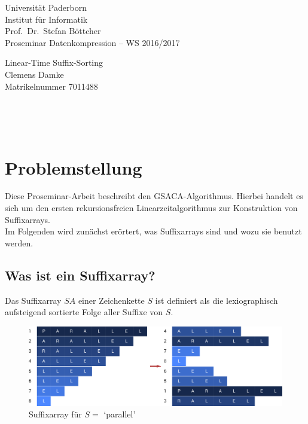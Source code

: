 \documentclass[twoside,11pt]{article}
\theoremstyle{break}
\begin{document}
\pagestyle{empty}

\begin{center}
	\sffamily
    Universität Paderborn \\
    Institut für Informatik \\
    Prof.\ Dr.\ Stefan Böttcher\\[2ex]
    \Large Proseminar Datenkompression – WS 2016/2017

	\vspace*{\fill}
	\Huge \textcolor{blau}{Linear-Time Suffix-Sorting} \\[1ex]
    \LARGE Clemens Damke \\[1ex]
    \Large Matrikelnummer 7011488
	\vspace*{\fill}
\end{center}

\newpage
\
\newpage

\pagestyle{fancy}
\tableofcontents

\newpage
\pagestyle{empty}
\
\newpage
\pagestyle{fancy}

\section{Problemstellung}

Diese Proseminar-Arbeit beschreibt den GSACA-Algorithmus. Hierbei handelt es sich um den ersten rekursionsfreien Linearzeitalgorithmus zur Konstruktion von Suffixarrays. \\

Im Folgenden wird zunächst erörtert, was Suffixarrays sind und wozu sie benutzt werden.

\subsection{Was ist ein Suffixarray?}

Das Suffixarray $SA$ einer Zeichenkette $S$ ist definiert als die lexiographisch aufsteigend sortierte Folge aller Suffixe von $S$.

\begin{figure}[h]
	\centering
	\includegraphics[width=\linewidth,bb=0 0 1474 462]{./assets/whatIsASuffixArray.pdf}
	\caption{Suffixarray für $S =$ `parallel'}
\label{fig:whatIsASuffixArray}
\end{figure}
\end{document}
